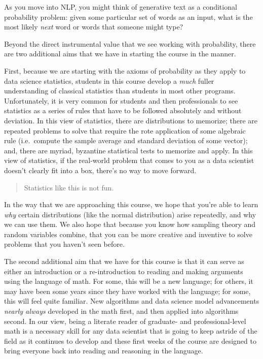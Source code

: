 \documentclass[
]{book}
\theoremstyle{definition}
\theoremstyle{definition}
\theoremstyle{definition}
\theoremstyle{definition}
\theoremstyle{remark}
\begin{document}
As you move into NLP, you might think of generative text as a conditional probability problem: given some particular set of words as an input, what is the most likely \emph{next} word or words that someone might type?

Beyond the direct instrumental value that we see working with probability, there are two additional aims that we have in starting the course in the manner.

First, because we are starting with the axioms of probability as they apply to data science statistics, students in this course develop a \emph{much} fuller understanding of classical statistics than students in most other programs. Unfortunately, it is very common for students and then professionals to see statistics as a series of rules that have to be followed absolutely and without deviation. In this view of statistics, there are distributions to memorize; there are repeated problems to solve that require the rote application of some algebraic rule (i.e.~compute the sample average and standard deviation of some vector); and, there are myriad, byzantine statistical tests to memorize and apply. In this view of statistics, if the real-world problem that comes to you as a data scientist doesn't clearly fit into a box, there's no way to move forward.

\begin{quote}
Statistics like this is not fun.
\end{quote}

In the way that we are approaching this course, we hope that you're able to learn \emph{why} certain distributions (like the normal distribution) arise repeatedly, and why we can use them. We also hope that because you know how sampling theory and random variables combine, that you can be more creative and inventive to solve problems that you haven't seen before.

The second additional aim that we have for this course is that it can serve as either an introduction or a re-introduction to reading and making arguments using the language of math. For some, this will be a new language; for others, it may have been some years since they have worked with the language; for some, this will feel quite familiar. New algorithms and data science model advancements \emph{nearly always} developed in the math first, and then applied into algorithms second. In our view, being a literate reader of graduate- and professional-level math is a necessary skill for any data scientist that is going to keep astride of the field as it continues to develop and these first weeks of the course are designed to bring everyone back into reading and reasoning in the language.
\end{document}
